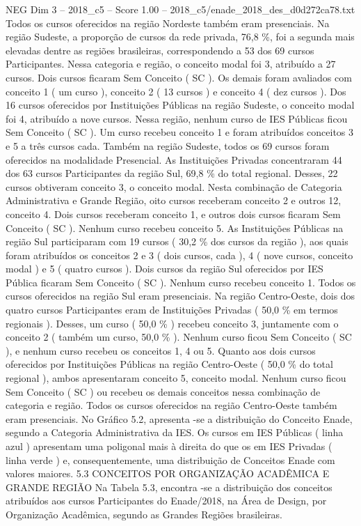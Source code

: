 \begin{textsample}{NEG Dim 3 – 2018\_c5 – Score 1.00 – 2018\_c5/enade\_2018\_des\_d0d272ca78.txt}
Todos os cursos oferecidos na região Nordeste também eram presenciais.
Na região Sudeste, a proporção de cursos da rede privada, 76,8 \%, foi a segunda mais elevadas dentre as regiões brasileiras, correspondendo a 53 dos 69 cursos Participantes.
Nessa categoria e região, o conceito modal foi 3, atribuído a 27 cursos.
Dois cursos ficaram Sem Conceito ( SC ).
Os demais foram avaliados com conceito 1 ( um curso ), conceito 2 ( 13 cursos ) e conceito 4 ( dez cursos ).
Dos 16 cursos oferecidos por Instituições Públicas na região Sudeste, o conceito modal foi 4, atribuído a nove cursos.
Nessa região, nenhum curso de IES Públicas ficou Sem Conceito ( SC ).
Um curso recebeu conceito 1 e foram atribuídos conceitos 3 e 5 a três cursos cada.
Também na região Sudeste, todos os 69 cursos foram oferecidos na modalidade Presencial.
As Instituições Privadas concentraram 44 dos 63 cursos Participantes da região Sul, 69,8 \% do total regional.
Desses, 22 cursos obtiveram conceito 3, o conceito modal.
Nesta combinação de Categoria Administrativa e Grande Região, oito cursos receberam conceito 2 e outros 12, conceito 4.
Dois cursos receberam conceito 1, e outros dois cursos ficaram Sem Conceito ( SC ).
Nenhum curso recebeu conceito 5.
As Instituições Públicas na região Sul participaram com 19 cursos ( 30,2 \% dos cursos da região ), aos quais foram atribuídos os conceitos 2 e 3 ( dois cursos, cada ), 4 ( nove cursos, conceito modal ) e 5 ( quatro cursos ).
Dois cursos da região Sul oferecidos por IES Pública ficaram Sem Conceito ( SC ).
Nenhum curso recebeu conceito 1.
Todos os cursos oferecidos na região Sul eram presenciais.
Na região Centro-Oeste, dois dos quatro cursos Participantes eram de Instituições Privadas ( 50,0 \% em termos regionais ).
Desses, um curso ( 50,0 \% ) recebeu conceito 3, juntamente com o conceito 2 ( também um curso, 50,0 \% ).
Nenhum curso ficou Sem Conceito ( SC ), e nenhum curso recebeu os conceitos 1, 4 ou 5.
Quanto aos dois cursos oferecidos por Instituições Públicas na região Centro-Oeste ( 50,0 \% do total regional ), ambos apresentaram conceito 5, conceito modal.
Nenhum curso ficou Sem Conceito ( SC ) ou recebeu os demais conceitos nessa combinação de categoria e região.
Todos os cursos oferecidos na região Centro-Oeste também eram presenciais.
No Gráfico 5.2, apresenta -se a distribuição do Conceito Enade, segundo a Categoria Administrativa da IES.
Os cursos em IES Públicas ( linha azul ) apresentam uma poligonal mais à direita do que os em IES Privadas ( linha verde ) e, consequentemente, uma distribuição de Conceitos Enade com valores maiores. 5.3 CONCEITOS POR ORGANIZAÇÃO ACADÊMICA E GRANDE REGIÃO Na Tabela 5.3, encontra -se a distribuição dos conceitos atribuídos aos cursos Participantes do Enade/2018, na Área de Design, por Organização Acadêmica, segundo as Grandes Regiões brasileiras.

\end{textsample}
